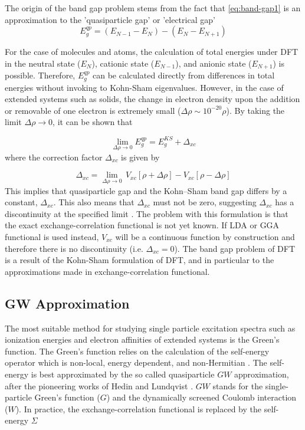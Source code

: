 The origin of the band gap problem stems from the fact that \eqref{eq:band-gap1} is an approximation to the 'quasiparticle gap' or 'electrical gap' \citep{Perdew2017}
\begin{equation}
	E_g^{qp} = (E_{N - 1} - E_{N} )  - (E_{N} - E_{N + 1}) 
\end{equation}

For the case of molecules and atoms, the calculation of total energies under DFT in the neutral state ($E_{N}$), cationic state ($E_{N-1}$), and anionic state ($E_{N+1}$) is possible. Therefore, $E_g^{qp}$ can be calculated directly from  differences in total energies without invoking to Kohn-Sham eigenvalues. However, in the case of extended systems such as solids, the change in electron density upon the addition or removable of one electron is extremely small ($\Delta\rho \sim 10^{-20} \rho$). By taking the limit $\Delta\rho \rightarrow 0$, it can be shown that \citep{Perdew1982,Perdew1983}

\begin{equation}
	\lim_{\Delta\rho \to 0} E_g^{qp} = E_g^{KS} + \Delta_{xc}
\end{equation}
where the correction factor $\Delta_{xc}$ is given by

\begin{equation} \label{eq:xc_discon}
	\Delta_{xc}  = \lim_{\Delta\rho \to 0}\, V_{xc}[\rho + \Delta\rho] - V_{xc}[\rho - \Delta\rho]
\end{equation}
This implies that quasiparticle gap and the Kohn–Sham band gap
differs by a constant, $\Delta_{xc}$. This also means that $\Delta_{xc}$ must not be zero, suggesting $\Delta_{xc}$ has a discontinuity at the specified limit \citep{Sham1983,Baerends2017}. The problem with this formulation is that the exact exchange-correlation functional is not yet known. If LDA or GGA functional is used instead, $V_{xc}$ will be a continuous function by construction and therefore there is no discontinuity (i.e. $\Delta_{xc} = 0$). The band gap problem of DFT is a result of the Kohn-Sham formulation of DFT, and in particular to the approximations made in exchange-correlation functional.  

\subsection{GW Approximation}
The most suitable method for studying  single particle excitation spectra such as ionization energies and electron affinities of extended systems is the Green's function. The Green's function relies on the calculation of the self-energy operator which is non-local, energy dependent, and non-Hermitian \citep{Setten2012}.  The self-energy is best approximated by the so called quasiparticle $GW$ approximation, after the pioneering works of Hedin and Lundqvist \citep{Hedin1965,Hedin1970}. $GW$ stands for the single-particle Green's function ($G$) and the dynamically screened Coulomb interaction ($W$). In practice, the exchange-correlation functional is replaced by the self-energy $\Sigma$ \citep{Hybertsen1986}

